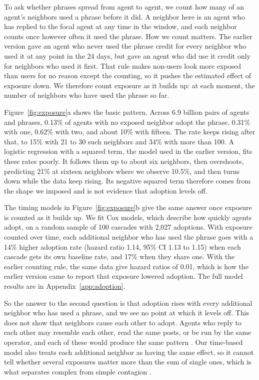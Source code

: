 \documentclass[11pt]{article}
\begin{document}
To ask whether phrases spread from agent to agent, we count how many of an agent's neighbors used a phrase before it did. A neighbor here is an agent who has replied to the focal agent at any time in the window, and each neighbor counts once however often it used the phrase. How we count matters. The earlier version gave an agent who never used the phrase credit for every neighbor who used it at any point in the 24 days, but gave an agent who did use it credit only for neighbors who used it first. That rule makes non-users look more exposed than users for no reason except the counting, so it pushes the estimated effect of exposure down. We therefore count exposure as it builds up: at each moment, the number of neighbors who have used the phrase so far.

Figure~\ref{fig:exposure}a shows the basic pattern. Across 6.9 billion pairs of agents and phrases, 0.13\% of agents with no exposed neighbor adopt the phrase, 0.31\% with one, 0.62\% with two, and about 10\% with fifteen. The rate keeps rising after that, to 15\% with 21 to 30 such neighbors and 34\% with more than 100. A logistic regression with a squared term, the model used in the earlier version, fits these rates poorly. It follows them up to about six neighbors, then overshoots, predicting 21\% at sixteen neighbors where we observe 10.5\%, and then turns down while the data keep rising. Its negative squared term therefore comes from the shape we imposed and is not evidence that adoption levels off.

The timing models in Figure~\ref{fig:exposure}b give the same answer once exposure is counted as it builds up. We fit Cox models, which describe how quickly agents adopt, on a random sample of 100 cascades with 2,027 adoptions. With exposure counted over time, each additional neighbor who has used the phrase goes with a 14\% higher adoption rate (hazard ratio 1.14, 95\% CI 1.13 to 1.15) when each cascade gets its own baseline rate, and 17\% when they share one. With the earlier counting rule, the same data give hazard ratios of 0.01, which is how the earlier version came to report that exposure lowered adoption. The full model results are in Appendix~\ref{app:adoption}.

So the answer to the second question is that adoption rises with every additional neighbor who has used a phrase, and we see no point at which it levels off. This does not show that neighbors cause each other to adopt. Agents who reply to each other may resemble each other, read the same posts, or be run by the same operator, and each of these would produce the same pattern \citep{shalizi2011homophily}. Our time-based model also treats each additional neighbor as having the same effect, so it cannot tell whether several exposures matter more than the sum of single ones, which is what separates complex from simple contagion \citep{centola2007complex}.
\end{document}
